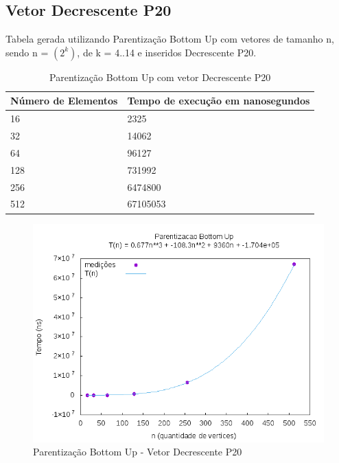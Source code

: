 \documentclass[12pt,a4paper,twoside]{report}
\begin{document}
\subsection{Vetor Decrescente P20}
Tabela gerada utilizando Parentização Bottom Up com vetores de tamanho n, sendo n = $(2^k)$, de k = 4..14 e inseridos Decrescente P20.
\begin{table}[H]
\centering
\caption{Parentização Bottom Up com vetor Decrescente P20}
\label{my-label}
\begin{tabular}{|l|l|}
\hline
\multicolumn{1}{|c|}{\textbf{Número de Elementos}} & \multicolumn{1}{c|}{\textbf{Tempo de execução em nanosegundos}} \\ \hline
16 & 2325 \\ \hline
32 & 14062 \\ \hline
64 & 96127 \\ \hline
128 & 731992 \\ \hline
256 & 6474800 \\ \hline
512 & 67105053 \\ \hline
\end{tabular}
\end{table}

\begin{figure}[H]
    \centering
    \includegraphics[width=0.7\linewidth]{graficos/Parentizacao BottomUp/Decrescente P20/ParentizacaoBottomUp.png}
  \caption{Parentização Bottom Up - Vetor Decrescente P20}
\end{figure}
\end{document}
